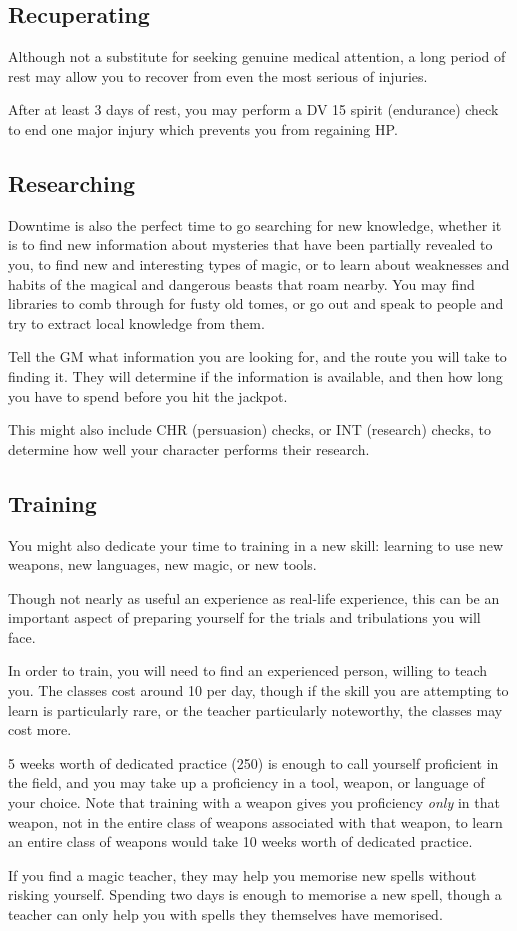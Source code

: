 \subsection{Recuperating}

Although not a substitute for seeking genuine medical attention, a long period of rest may allow you to recover from even the most serious of injuries. 

After at least 3 days of rest, you may perform a DV 15 spirit (endurance) check to end one major injury which prevents you from regaining HP. 


\subsection{Researching}

Downtime is also the perfect time to go searching for new knowledge, whether it is to find new information about mysteries that have been partially revealed to you, to find new and interesting types of magic, or to learn about weaknesses and habits of the magical and dangerous beasts that roam nearby. You may find libraries to comb through for fusty old tomes, or go out and speak to people and try to extract local knowledge from them. 

Tell the GM what information you are looking for, and the route you will take to finding it. They will determine if the information is available, and then how long you have to spend before you hit the jackpot. 

This might also include CHR (persuasion) checks, or INT (research) checks, to determine how well your character performs their research. 
 

\subsection{Training}

You might also dedicate your time to training in a new skill: learning to use new weapons, new languages, new magic, or new tools. 

Though not nearly as useful an experience as real-life experience, this can be an important aspect of preparing yourself for the trials and tribulations you will face. 

In order to train, you will need to find an experienced person, willing to teach you. The classes cost around \galleon{}10 per day, though if the skill you are attempting to learn is particularly rare, or the teacher particularly noteworthy, the classes may cost more.  

5 weeks worth of dedicated practice (\galleon{}250) is enough to call yourself proficient in the field, and you may take up a proficiency in a tool, weapon, or language of your choice. Note that training with a weapon gives you proficiency {\it only} in that weapon, not in the entire class of weapons associated with that weapon, to learn an entire class of weapons would take 10 weeks worth of dedicated practice. 

If you find a magic teacher, they may help you memorise new spells without risking yourself. Spending two days is enough to memorise a new spell, though a teacher can only help you with spells they themselves have memorised. 